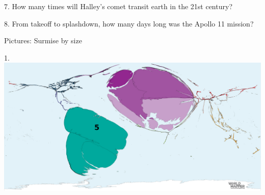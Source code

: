 \begin{frame}
\begin{center}
\Large
7. How many times will Halley's comet transit earth in the 21st century?
\\
\end{center}
\end{frame}
\begin{frame}
\begin{center}
\Large
8. From takeoff to splashdown, how many days long was the Apollo 11 mission?
\\
\end{center}
\end{frame}
\begin{frame}
\begin{center}
\Huge
Pictures: Surmise by size
\end{center}
\end{frame}
\begin{frame}
\begin{center}
\Large
1. 
\\
\vspace{0.5em}\includegraphics[height=0.6\paperheight]{maps/picture_1.png}
\\
\end{center}
\end{frame}
